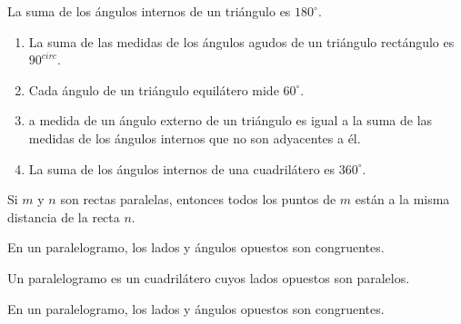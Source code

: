     \begin{teo}
	La suma de los ángulos internos de un triángulo es $180^{\circ}$.\\
    \end{teo}

	\begin{cor}
	    \begin{enumerate}[\bfseries a)]
		\item La suma de las medidas de los ángulos agudos de un triángulo rectángulo es $90^{circ}$.
		\item Cada ángulo de un triángulo equilátero mide $60^{\circ}$.
		\item a medida de un ángulo externo de un triángulo es igual a la suma de las medidas de los ángulos internos que no son adyacentes a él.
		\item La suma de los ángulos internos de una cuadrilátero es $360^{\circ}$.\\
	    \end{enumerate}
	\end{cor}

    \begin{teo}
	Si $m$ y $n$ son rectas paralelas, entonces todos los puntos de $m$ están a la misma distancia de la recta $n$.\\
    \end{teo}

	    \begin{proposicion}
		En un paralelogramo, los lados y ángulos opuestos son congruentes.\\
	    \end{proposicion}

    \begin{def.}
	Un paralelogramo es un cuadrilátero cuyos lados opuestos son paralelos.\\
    \end{def.}

	    \begin{proposicion}
		En un paralelogramo, los lados y ángulos opuestos son congruentes.\\
	    \end{proposicion}

